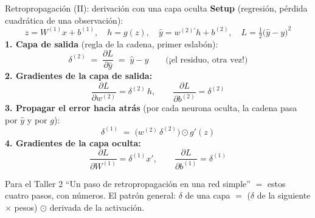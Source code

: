\documentclass{beamer}
\newcommand{\1}{\mathbb{I}}
\begin{document}
\begin{frame}{Retropropagación (II): derivación con una capa oculta}
\small
\textbf{Setup} (regresión, pérdida cuadrática de una observación):
\[ z = W^{(1)} x + b^{(1)}, \quad h = g(z), \quad \hat{y} = w^{(2)\prime} h + b^{(2)}, \quad L = \tfrac{1}{2}\big(\hat{y} - y\big)^2 \]
\pause
\textbf{1. Capa de salida} (regla de la cadena, primer eslabón):
\[ \delta^{(2)} \;=\; \frac{\partial L}{\partial \hat{y}} \;=\; \hat{y} - y \qquad \text{(¡el residuo, otra vez!)} \]
\pause
\textbf{2. Gradientes de la capa de salida:}
\[ \frac{\partial L}{\partial w^{(2)}} = \delta^{(2)}\, h, \qquad \frac{\partial L}{\partial b^{(2)}} = \delta^{(2)} \]
\pause
\textbf{3. Propagar el error hacia atrás} (por cada neurona oculta, la cadena pasa por $\hat{y}$ y por $g$):
\[ \delta^{(1)} \;=\; \big( w^{(2)} \, \delta^{(2)} \big) \odot g'(z) \]
\pause
\textbf{4. Gradientes de la capa oculta:}
\[ \frac{\partial L}{\partial W^{(1)}} = \delta^{(1)} x', \qquad \frac{\partial L}{\partial b^{(1)}} = \delta^{(1)} \]
\pause
\begin{block}{Para el Taller 2}
``Un paso de retropropagación en una red simple'' $=$ estos cuatro pasos, con números. El patrón general: $\delta$ de una capa $=$ ($\delta$ de la siguiente $\times$ pesos) $\odot$ derivada de la activación.
\end{block}
\end{frame}
\end{document}
